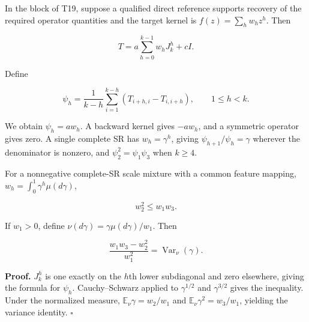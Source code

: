 \documentclass[11pt,a4paper]{article}
\begin{document}
\par
\noindent\begin{minipage}{\linewidth}

In the block of T19, suppose a qualified direct reference supports
recovery of the required operator quantities and the target kernel is
\(f(z)=\sum_h w_hz^h\). Then

\[
T=a\sum_{h=0}^{k-1}w_hJ_k^h+cI.
\]

\end{minipage}\par

\par
\noindent\begin{minipage}{\linewidth}

Define

\[
\psi_h=\frac1{k-h}\sum_{i=1}^{k-h}
(T_{i+h,i}-T_{i,i+h}),\qquad1\le h<k.
\]

\end{minipage}\par

We obtain \(\psi_h=aw_h\). A backward kernel gives \(-aw_h\), and a
symmetric operator gives zero. A single complete SR has
\(w_h=\gamma^h\), giving \(\psi_{h+1}/\psi_h=\gamma\) wherever the
denominator is nonzero, and \(\psi_2^2=\psi_1\psi_3\) when \(k\ge4\).

\par
\noindent\begin{minipage}{\linewidth}

For a nonnegative complete-SR scale mixture with a common feature
mapping, \(w_h=\int_0^1\gamma^h\mu(d\gamma)\),

\[
w_2^2\le w_1w_3.
\]

\end{minipage}\par

\par
\noindent\begin{minipage}{\linewidth}

If \(w_1>0\), define \(\nu(d\gamma)=\gamma\mu(d\gamma)/w_1\). Then

\[
\frac{w_1w_3-w_2^2}{w_1^2}
=\operatorname{Var}_\nu(\gamma).
\]

\end{minipage}\par

\textbf{Proof.} \(J_k^h\) is one exactly on the \(h\)th lower
subdiagonal and zero elsewhere, giving the formula for \(\psi_h\).
Cauchy–Schwarz applied to \(\gamma^{1/2}\) and \(\gamma^{3/2}\) gives
the inequality. Under the normalized measure,
\(\mathbb E_\nu\gamma=w_2/w_1\) and \(\mathbb E_\nu\gamma^2=w_3/w_1\),
yielding the variance identity. \(\square\)
\end{document}
